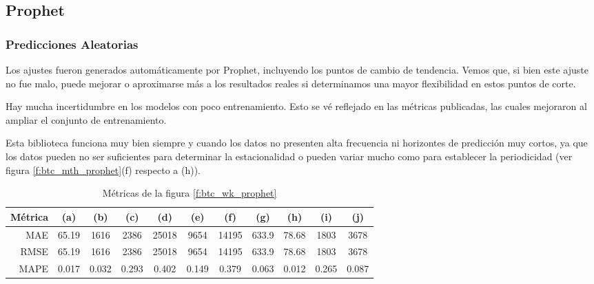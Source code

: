 \documentclass[a4paper,10pt]{article}
\begin{document}
\subsection{Prophet}

\subsubsection{Predicciones Aleatorias}

Los ajustes fueron generados automáticamente por Prophet, incluyendo los puntos de cambio de tendencia. Vemos que, si bien este ajuste no fue malo, puede mejorar o aproximarse más a los resultados reales si determinamos una mayor flexibilidad en estos puntos de corte.

Hay mucha incertidumbre en los modelos con poco entrenamiento. Esto se vé reflejado en las métricas publicadas, las cuales mejoraron al ampliar el conjunto de entrenamiento.

Esta biblioteca funciona muy bien siempre y cuando los datos no presenten alta frecuencia ni horizontes de predicción muy cortos, ya que los datos pueden no ser suficientes para
determinar la estacionalidad o pueden variar mucho como para establecer la periodicidad (ver figura \ref{f:btc_mth_prophet}(f) respecto a (h)).

\begin{table}[H]
 \begin{center}
 \resizebox{12cm}{!} {
  \begin{tabular}{|r|c|c|c|c|c|c|c|c|c|c|}
    Métrica & (a) & (b) & (c) & (d) & (e) & (f) & (g) & (h) & (i) & (j) \\ \hline
    MAE & 65.19 & 1616 & 2386 & 25018 & 9654 & 14195 & 633.9 & 78.68 & 1803 & 3678 \\
    RMSE & 65.19 & 1616 & 2386 & 25018 & 9654 & 14195 & 633.9 & 78.68 & 1803 & 3678 \\
    MAPE & 0.017 & 0.032 & 0.293 & 0.402 & 0.149 & 0.379 & 0.063 & 0.012 & 0.265 & 0.087 \\ \hline
  \end{tabular}
  }
  \caption{Métricas de la figura \ref{f:btc_wk_prophet}}
  \label{tab:btc_prophet_wk}
 \end{center}
\end{table}
\end{document}
